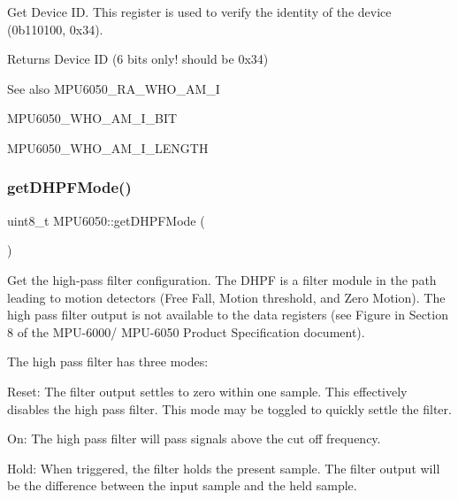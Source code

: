 Get Device ID. This register is used to verify the identity of the device (0b110100, 0x34). \begin{DoxyReturn}{Returns}
Device ID (6 bits only! should be 0x34) 
\end{DoxyReturn}
\begin{DoxySeeAlso}{See also}
M\+P\+U6050\+\_\+\+R\+A\+\_\+\+W\+H\+O\+\_\+\+A\+M\+\_\+I 

M\+P\+U6050\+\_\+\+W\+H\+O\+\_\+\+A\+M\+\_\+\+I\+\_\+\+B\+IT 

M\+P\+U6050\+\_\+\+W\+H\+O\+\_\+\+A\+M\+\_\+\+I\+\_\+\+L\+E\+N\+G\+TH 
\end{DoxySeeAlso}
\mbox{\label{class_m_p_u6050_a4c3b84a906fcb5a65870fa557f797f4a}} 
\subsubsection{\texorpdfstring{getDHPFMode()}{getDHPFMode()}}
{\footnotesize\ttfamily uint8\+\_\+t M\+P\+U6050\+::get\+D\+H\+P\+F\+Mode (\begin{DoxyParamCaption}{ }\end{DoxyParamCaption})}

Get the high-\/pass filter configuration. The D\+H\+PF is a filter module in the path leading to motion detectors (Free Fall, Motion threshold, and Zero Motion). The high pass filter output is not available to the data registers (see Figure in Section 8 of the M\+P\+U-\/6000/ M\+P\+U-\/6050 Product Specification document).

The high pass filter has three modes\+:


\begin{DoxyPre}
   Reset: The filter output settles to zero within one sample. This
          effectively disables the high pass filter. This mode may be toggled
          to quickly settle the filter.\end{DoxyPre}



\begin{DoxyPre}   On:    The high pass filter will pass signals above the cut off frequency.\end{DoxyPre}



\begin{DoxyPre}   Hold:  When triggered, the filter holds the present sample. The filter
          output will be the difference between the input sample and the held
          sample.
\end{DoxyPre}



